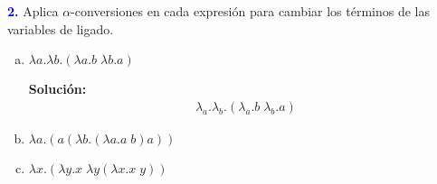 \textbf{\textcolor{blue}{2.}} \Large
Aplica $\alpha$-conversiones en cada expresión
para cambiar los términos de las variables de ligado.
\begin{enumerate}[a)]
    \item $\lambda a.\lambda b.(\lambda a.b \; \lambda b.a)$
    
    \textbf{Solución:}
    \begin{eqnarray*}
        \lambda_a . \lambda_b . (\lambda_a . b \; \lambda_b . a)
    \end{eqnarray*}
    \item $\lambda a.(a(\lambda b.(\lambda a.a\; b)a))$
    \item $\lambda x.(\lambda y.x\; \lambda y(\lambda x.x \; y))$
\end{enumerate}
